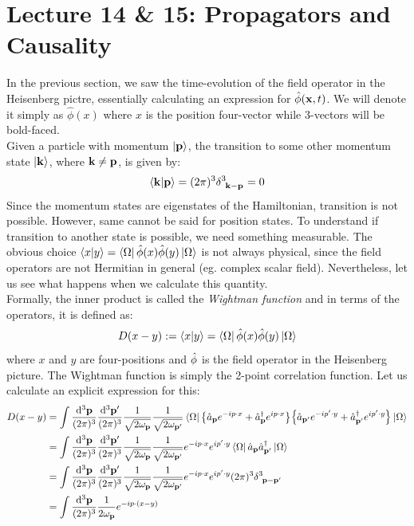\section*{Lecture 14 \& 15: Propagators and Causality}\label{sec:propag}
In the previous section, we saw the time-evolution of the field operator in the Heisenberg pictre, essentially calculating an expression for $\hat{\phi}(\vb{x},t)$. We will denote it simply as $\hat{\phi}(x)$ where $x$ is the position four-vector while 3-vectors will be bold-faced. \\[0.2cm]
Given a particle with momentum $\ket{\vb{p}}$, the transition to some other momentum state $\ket{\vb{k}}$, where $\vb{k}\neq \vb{p}$, is given by:
$$\braket{\vb{k}|\vb{p}} = (2\pi)^3 \delt{3}{\vb{k}-\vb{p}}= 0$$
Since the momentum states are eigenstates of the Hamiltonian, transition is not possible. However, same cannot be said for position states. To understand if transition to another state is possible, we need something measurable. The obvious choice $\braket{{x}|{y}} = \bra{\Omega}\hat{\phi}({x})\hat{\phi}({y})\ket{\Omega}$ is not always physical, since the field operators are not Hermitian in general (eg. complex scalar field). Nevertheless, let us see what happens when we calculate this quantity. \\[0.2cm]
Formally, the inner product is called the \textit{Wightman function} and in terms of the operators, it is defined as:
$$D(x-y) := \braket{{x}|{y}} = \bra{\Omega}\hat{\phi}({x})\hat{\phi}({y})\ket{\Omega} $$
where $x$ and $y$ are four-positions and $\hat{\phi}$ is the field operator in the Heisenberg picture. The Wightman function is simply the 2-point correlation function. Let us calculate an explicit expression for this:
\begin{align}\label{eqn:dxy}
   \begin{split}
     D(x-y)  &= \int \meas{\vb{p}}\meas{\vb{p}'} \frac{1}{\sqrt{2\omp}}\frac{1}{\sqrt{2\ompd}}\vacb \qty{\annp e^{-ip\cdot x}+\crep e^{ip\cdot x}}\qty{\annpd e^{-ip'\cdot y}+\crepd e^{ip'\cdot y}}\vac\\
    &=\int \meas{\vb{p}}\meas{\vb{p}'} \frac{1}{\sqrt{2\omp}}\frac{1}{\sqrt{2\ompd}}e^{-ip\cdot x} e^{ip'\cdot y}\vacb \annp \crepd \vac\\
    &=\int \meas{\vb{p}}\meas{\vb{p}'} \frac{1}{\sqrt{2\omp}}\frac{1}{\sqrt{2\ompd}}e^{-ip\cdot x} e^{ip'\cdot y}(2\pi)^3\delt{3}{\vb{p}-\vb{p}'}\\
    &=\int \meas{\vb{p}} \frac{1}{2\omp}e^{-ip\cdot (x-y)} 
   \end{split}
\end{align}
